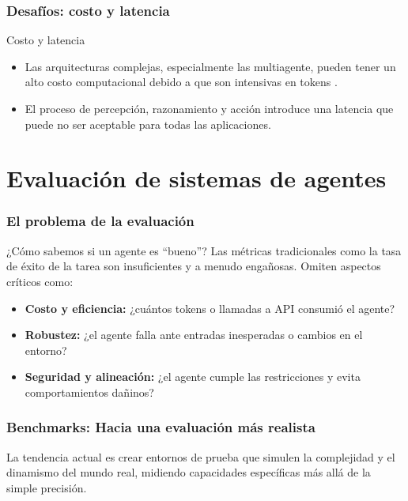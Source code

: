 \documentclass[handout]{beamer}
\begin{document}
\begin{frame}
    \frametitle{Desafíos: costo y latencia}
    \begin{block}{Costo y latencia}
        \begin{itemize}
            \item Las arquitecturas complejas, especialmente las multiagente, pueden tener un alto costo computacional debido a que son intensivas en tokens \parencite{li2024survey}.
            \item El proceso de percepción, razonamiento y acción introduce una latencia que puede no ser aceptable para todas las aplicaciones.
        \end{itemize}
    \end{block}
\end{frame}

\section{Evaluación de sistemas de agentes}

\begin{frame}
  \frametitle{El problema de la evaluación}
  \begin{alertblock}{¿Cómo sabemos si un agente es ``bueno''?}
    Las métricas tradicionales como la tasa de éxito de la tarea son insuficientes y a menudo engañosas. Omiten aspectos críticos como:
    \begin{itemize}
        \item \textbf{Costo y eficiencia:} ¿cuántos tokens o llamadas a API consumió el agente?
        \item \textbf{Robustez:} ¿el agente falla ante entradas inesperadas o cambios en el entorno?
        \item \textbf{Seguridad y alineación:} ¿el agente cumple las restricciones y evita comportamientos dañinos?
    \end{itemize}
     \raggedleft\footnotesize{\parencite{kapoor2024ai, yehudai2025surveyevaluationllmbasedagents}}
  \end{alertblock}
\end{frame}

\begin{frame}
  \frametitle{Benchmarks: Hacia una evaluación más realista}
  \begin{block}{}
    La tendencia actual es crear entornos de prueba que simulen la complejidad y el dinamismo del mundo real, midiendo capacidades específicas más allá de la simple precisión.
  \end{block}
\end{frame}
\end{document}
